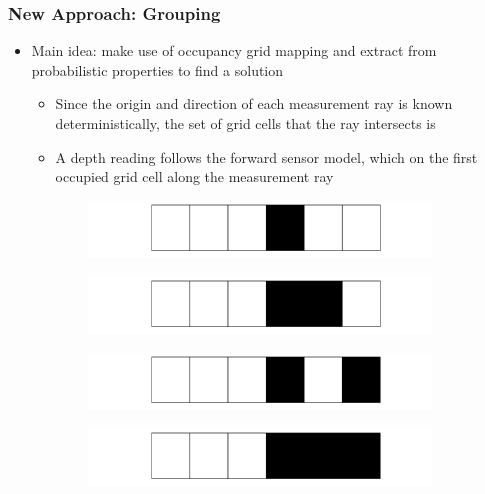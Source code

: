 \documentclass[11pt,professionalfonts,hyperref={pdftex,pdfpagemode=none,pdfstartview=FitH}]{beamer}
\renewcommand{\emph}[1]{\textit{\textbf{\color{blue}{#1}}}}
\begin{document}
\begin{frame}
\frametitle{New Approach: Grouping}

\begin{itemize}
    \item Main idea: make use of occupancy grid mapping \emph{assumptions} and extract \emph{patterns} from probabilistic properties to find a \emph{computationally-efficient} solution
	\begin{itemize}
		\item Since the origin and direction of each measurement ray is known deterministically, the set of grid cells that the ray intersects is \emph{known through geometry}
		\item A depth reading follows the forward sensor model, which \emph{only depends} on the first occupied grid cell along the measurement ray
	\end{itemize}
\end{itemize}
\setcounter{subfigure}{0}
\begin{figure}
  \centering
  \begin{subfigure}[t]{.45\linewidth}
    \centering\includegraphics[width=\linewidth]{rkplus_1.png}
  \end{subfigure}
  \begin{subfigure}[t]{.45\linewidth}
    \centering\includegraphics[width=\linewidth]{rkplus_2.png}
  \end{subfigure}
    \begin{subfigure}[t]{.45\linewidth}
    \centering\includegraphics[width=\linewidth]{rkplus_3.png}
  \end{subfigure}
  \begin{subfigure}[t]{.45\linewidth}
    \centering\includegraphics[width=\linewidth]{rkplus_4.png}

\end{subfigure}
\end{figure}
\end{frame}
\end{document}
